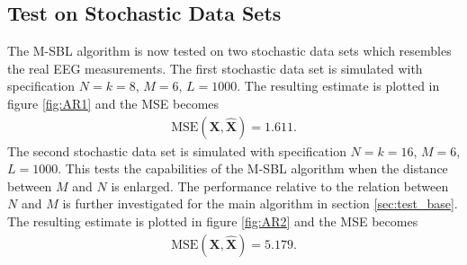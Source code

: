 \subsection{Test on Stochastic Data Sets}
The M-SBL algorithm is now tested on two stochastic data sets which resembles the real EEG measurements. 
The first stochastic data set is simulated with specification $N=k=8$, $M = 6$, $L=1000$. 
The resulting estimate is plotted in figure \ref{fig:AR1} and the MSE becomes 
\begin{align*}
\text{MSE}(\mathbf{X}, \hat{\mathbf{X}}) = 1.611.
\end{align*}  
The second stochastic data set is simulated with specification $N=k=16$, $M = 6$, $L=1000$. 
This tests the capabilities of the M-SBL algorithm when the distance between $M$ and $N$ is enlarged. 
The performance relative to the relation between $N$ and $M$ is further investigated for the main algorithm in section \ref{sec:test_base}.
The resulting estimate is plotted in figure \ref{fig:AR2} and the MSE becomes 
\begin{align*}
\text{MSE}(\mathbf{X}, \hat{\mathbf{X}}) = 5.179. 
\end{align*}  

